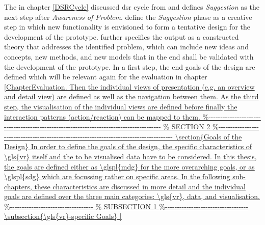The in chapter \ref{DSRCycle} discussed \gls{dsr} cycle from \cite{Vaishnavi2008} and \cite{Hevner2010} defines \textit{Suggestion} as the next step after \textit{Awareness of Problem}. \cite{Vaishnavi2008} define the \textit{Suggestion} phase as a creative step in which new functionality is envisioned to form a tentative design for the development of the prototype. \cite{Vaishnavi2008} further specifies the output as a constructed theory that addresses the identified problem, which can include new ideas and concepts, new methods, and new models that in the end shall be validated with the development of the prototype. \newline
In a first step, the end goals of the design are defined which will be relevant again for the evaluation in chapter \ref{ChapterEvaluation. Then the individual views of presentation (e.g. an overview and detail view) are defined as well as the navigation between them. As the third step, the visualisation of the individual views are defined before finally the interaction patterns (action/reaction) can be mapped to them.



\section{Goals of the Design}

In order to define the goals of the design, the specific characteristics of \gls{vr} itself and the to be visualised data have to be considered. In this thesis, the goals are defined either as \glspl{mdg} for the more overarching goals, or as \glspl{sdg} which are focussing rather on specific areas. In the following sub-chapters, these characteristics are discussed in more detail and the individual goals are defined over the three main categories: \gls{vr}, data, and visualisation.


\subsection{\gls{vr}-specific Goals}

}
